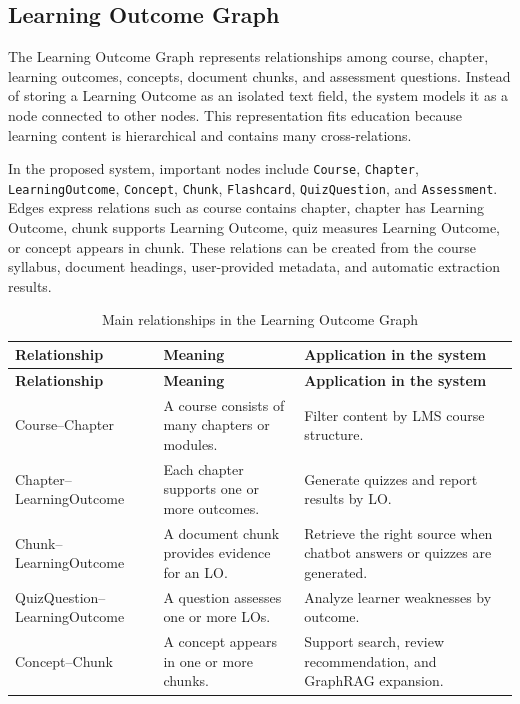 \subsection{Learning Outcome Graph}
\label{subsec:learning-outcome-graph}

The Learning Outcome Graph represents relationships among course,
chapter, learning outcomes, concepts, document chunks, and assessment
questions. Instead of storing a Learning Outcome as an isolated text
field, the system models it as a node connected to other nodes. This
representation fits education because learning content is hierarchical
and contains many cross-relations.

In the proposed system, important nodes include \texttt{Course},
\texttt{Chapter}, \texttt{LearningOutcome}, \texttt{Concept},
\texttt{Chunk}, \texttt{Flashcard}, \texttt{QuizQuestion}, and
\texttt{Assessment}. Edges express relations such as course contains
chapter, chapter has Learning Outcome, chunk supports Learning Outcome,
quiz measures Learning Outcome, or concept appears in chunk. These
relations can be created from the course syllabus, document headings,
user-provided metadata, and automatic extraction results.

\begin{longtable}{|p{3.2cm}|p{4.2cm}|p{6.6cm}|}
\caption{Main relationships in the Learning Outcome Graph}
\label{tab:learning-outcome-graph-relations}\\
\hline
\textbf{Relationship} & \textbf{Meaning} & \textbf{Application in the system} \\
\hline
\endfirsthead
\hline
\textbf{Relationship} & \textbf{Meaning} & \textbf{Application in the system} \\
\hline
\endhead
Course--Chapter & A course consists of many chapters or modules. & Filter content by LMS course structure. \\
\hline
Chapter--LearningOutcome & Each chapter supports one or more outcomes. & Generate quizzes and report results by LO. \\
\hline
Chunk--LearningOutcome & A document chunk provides evidence for an LO. & Retrieve the right source when chatbot answers or quizzes are generated. \\
\hline
QuizQuestion--LearningOutcome & A question assesses one or more LOs. & Analyze learner weaknesses by outcome. \\
\hline
Concept--Chunk & A concept appears in one or more chunks. & Support search, review recommendation, and GraphRAG expansion. \\
\hline
\end{longtable}

